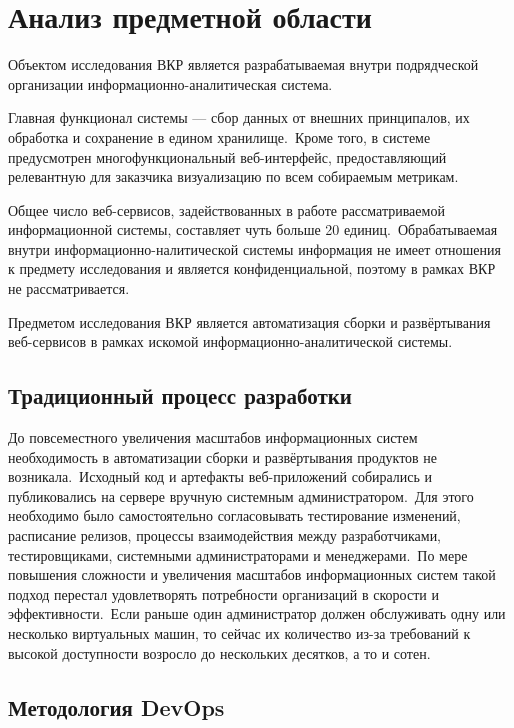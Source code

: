 \section{Анализ предметной области}\label{sec:subject-area-analysis}

Объектом исследования ВКР является разрабатываемая внутри подрядческой организации информационно-аналитическая система.

Главная функционал системы --- сбор данных от внешних принципалов, их обработка и сохранение в едином хранилище.\ Кроме того, в системе предусмотрен многофункциональный веб-интерфейс, предоставляющий релевантную для заказчика визуализацию по всем собираемым метрикам.

Общее число веб-сервисов, задействованных в работе рассматриваемой информационной системы, составляет чуть больше 20 единиц.\ Обрабатываемая внутри информационно-налитической системы информация не имеет отношения к предмету исследования и является конфиденциальной, поэтому в рамках ВКР не рассматривается.

Предметом исследования ВКР является автоматизация сборки и развёртывания веб-сервисов в рамках искомой информационно-аналитической системы.

\subsection{Традиционный процесс разработки}\label{subsec:traditional-development-process}

До повсеместного увеличения масштабов информационных систем необходимость в автоматизации сборки и развёртывания продуктов не возникала.\ Исходный код и артефакты веб-приложений собирались и публиковались на сервере вручную системным администратором.\ Для этого необходимо было самостоятельно согласовывать тестирование изменений, расписание релизов, процессы взаимодействия между разработчиками, тестировщиками, системными администраторами и менеджерами.\ По мере повышения сложности и увеличения масштабов информационных систем такой подход перестал удовлетворять потребности организаций в скорости и эффективности.\ Если раньше один администратор должен обслуживать одну или несколько виртуальных машин, то сейчас их количество из-за требований к высокой доступности возросло до нескольких десятков, а то и сотен.

\subsection{Методология DevOps}\label{subsec:devops-methodology}

